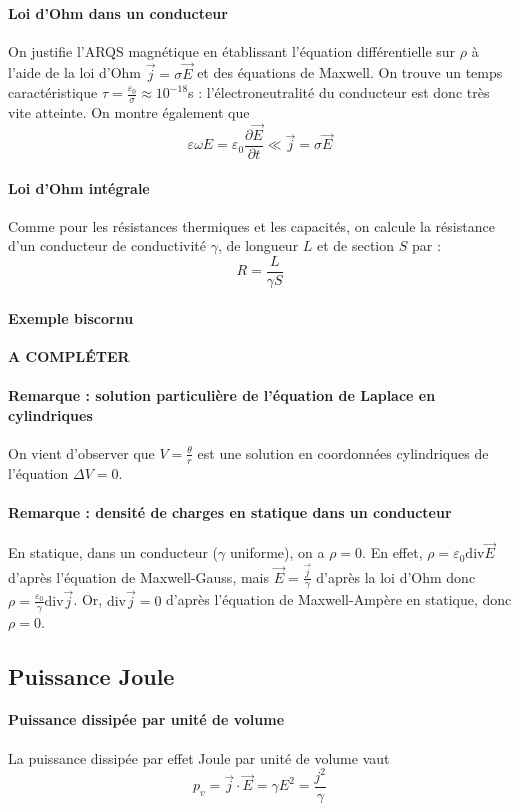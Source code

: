 \documentclass[french]{book}
\theoremstyle{plain}
\theoremstyle{definition}
\theoremstyle{remark}
\renewcommand{\div}{\text{div}}
\begin{document}
\paragraph{Loi d'Ohm dans un conducteur} On justifie l'ARQS magnétique en établissant l'équation différentielle sur $\rho$ à l'aide de la loi d'Ohm $\overrightarrow{j}=\sigma\overrightarrow{E}$ et des équations de Maxwell. On trouve un temps caractéristique $\displaystyle\tau=\frac{\varepsilon_0}{\sigma}\approx 10^{-18}$s : l'électroneutralité du conducteur est donc très vite atteinte. On montre également que $$\varepsilon\omega E=\varepsilon_0\frac{\partial \overrightarrow{E}}{\partial t}\ll\overrightarrow{j}=\sigma\overrightarrow{E}$$
\paragraph{Loi d'Ohm intégrale} Comme pour les résistances thermiques et les capacités, on calcule la résistance d'un conducteur de conductivité $\gamma$, de longueur $L$ et de section $S$ par : $$R=\frac{L}{\gamma S}$$
\paragraph{Exemple biscornu} \textbf{A COMPLÉTER}
\paragraph{Remarque : solution particulière de l'équation de Laplace en cylindriques} On vient d'observer que $V=\displaystyle\frac{\theta}{r}$ est une solution en coordonnées cylindriques de l'équation $\Delta V=0$.
\paragraph{Remarque : densité de charges en statique dans un conducteur} En statique, dans un conducteur ($\gamma$ uniforme), on a $\rho=0$. En effet, $\rho=\varepsilon_0 \div\overrightarrow{E}$ d'après l'équation de Maxwell-Gauss, mais $\overrightarrow{E}=\displaystyle\frac{\overrightarrow{j}}{\gamma}$ d'après la loi d'Ohm donc $\rho=\displaystyle\frac{\varepsilon_0}{\gamma}\div\overrightarrow{j}$. Or, $\div\overrightarrow{j}=0$ d'après l'équation de Maxwell-Ampère en statique, donc $\rho=0$.
\subsection{Puissance Joule}
\paragraph{Puissance dissipée par unité de volume}
La puissance dissipée par effet Joule par unité de volume vaut $$p_v=\overrightarrow{j}\cdot\overrightarrow{E}=\gamma E^2=\frac{j^2}{\gamma}$$
\end{document}
